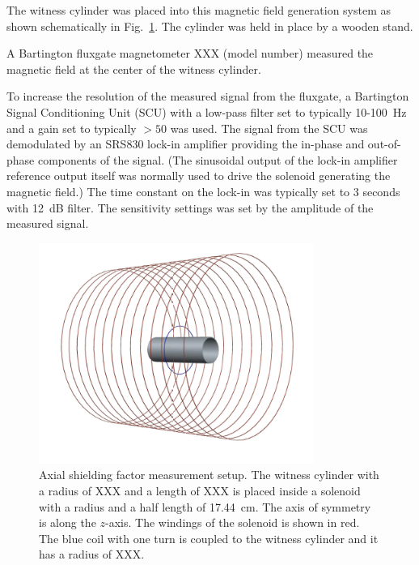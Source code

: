 The witness cylinder was placed into this magnetic field generation
system as shown schematically in Fig.~\ref{fig:geometry}.  The
cylinder was held in place by a wooden stand.

A Bartington fluxgate magnetometer XXX (model number) measured the
magnetic field at the center of the witness cylinder.




To increase the resolution of the measured signal from the fluxgate, a
Bartington Signal Conditioning Unit (SCU) with a low-pass filter set
to typically 10-100~Hz and a gain set to typically $>50$ was used.
The signal from the SCU was demodulated by an SRS830 lock-in amplifier
providing the in-phase and out-of-phase components of the signal.
(The sinusoidal output of the lock-in amplifier reference output
itself was normally used to drive the solenoid generating the magnetic
field.)  The time constant on the lock-in was typically set to 3
seconds with 12~dB filter. The sensitivity settings was set by the
amplitude of the measured signal.

\begin{figure}[h!]
\begin{center}
   \includegraphics[width=0.8\textwidth]{geometry.PNG}
    \caption{Axial shielding factor measurement setup. The witness
      cylinder with a radius of XXX and a length of XXX is placed
      inside a solenoid with a radius and a half length of
      17.44~cm. The axis of symmetry is along the $z$-axis. The
      windings of the solenoid is shown in red. The blue coil with one
      turn is coupled to the witness cylinder and it has a radius of
      XXX.  }
    \label{fig:geometry}
    \end{center}
\end{figure}

